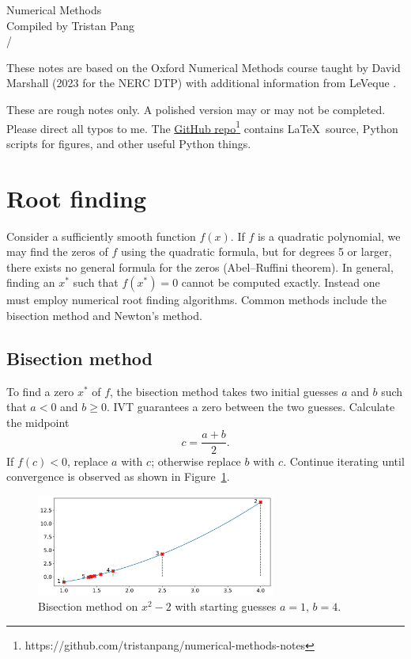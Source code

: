 \documentclass[11pt, a4paper]{article}
\theoremstyle{break}
\begin{document}
\begin{center}
{\LARGE Numerical Methods}\\
{\large Compiled by Tristan Pang}\\
{\the\month/\the\year}
\end{center}
These notes are based on the Oxford Numerical Methods course taught by David Marshall (2023 for the NERC DTP) with additional information from LeVeque \cite{leveque_finite_2007}.

These are rough notes only. A polished version may or may not be completed. Please direct all typos to me. The \href{https://github.com/tristanpang/numerical-methods-notes}{GitHub repo}\footnote{https://github.com/tristanpang/numerical-methods-notes} contains \LaTeX\ source, Python scripts for figures, and other useful Python things.

\tableofcontents



\section{Root finding}
Consider a sufficiently smooth function $f(x)$. If $f$ is a quadratic polynomial, we may find the zeros of $f$ using the quadratic formula, but for degrees 5 or larger, there exists no general formula for the zeros (Abel–Ruffini theorem). In general, finding an $x^*$ such that $f(x^*)=0$ cannot be computed exactly. Instead one must employ numerical root finding algorithms. Common methods include the bisection method and Newton's method.

\subsection{Bisection method}
To find a zero $x^*$ of $f$, the bisection method takes two initial guesses $a$ and $b$ such that $a<0$ and $b\geq0$. IVT guarantees a zero between the two guesses. Calculate the midpoint \[c=\frac{a+b}2.\] If $f(c)<0$, replace $a$ with $c$; otherwise replace $b$ with $c$. Continue iterating until convergence is observed as shown in Figure~\ref{fig:bisection}.

\begin{figure}\centering
	\includegraphics[width=0.7\textwidth]{Bisection}
	\caption{Bisection method on $x^2-2$ with starting guesses $a=1$, $b=4$.}\label{fig:bisection}
\end{figure}
\end{document}
